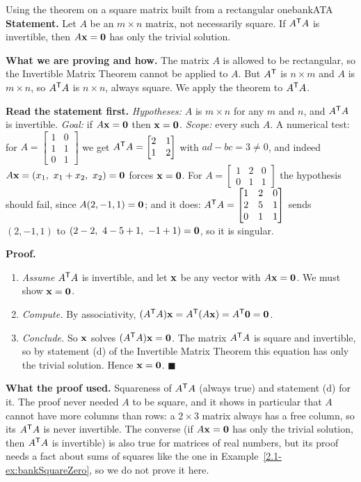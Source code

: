 \documentclass[11pt]{article}
\begin{document}
\begin{exmp}{Using the theorem on a square matrix built from a rectangular one}{bankATA}
\textbf{Statement.} Let $A$ be an $m\times n$ matrix, not necessarily square. If $A^{\mathsf T} A$ is invertible, then $A\mathbf{x}=\mathbf{0}$ has only the trivial solution.

\textbf{What we are proving and how.} The matrix $A$ is allowed to be rectangular, so the Invertible Matrix Theorem cannot be applied to $A$. But $A^{\mathsf T}$ is $n\times m$ and $A$ is $m\times n$, so $A^{\mathsf T} A$ is $n\times n$, always square. We apply the theorem to $A^{\mathsf T} A$.

\textbf{Read the statement first.} \emph{Hypotheses:} $A$ is $m\times n$ for any $m$ and $n$, and $A^{\mathsf T} A$ is invertible. \emph{Goal:} if $A\mathbf{x}=\mathbf{0}$ then $\mathbf{x}=\mathbf{0}$. \emph{Scope:} every such $A$. A numerical test: for $A=\begin{bmatrix}1&0\\1&1\\0&1\end{bmatrix}$ we get $A^{\mathsf T} A=\begin{bmatrix}2&1\\1&2\end{bmatrix}$ with $ad-bc=3\neq0$, and indeed $A\bv{x}=(x_1,\ x_1+x_2,\ x_2)=\bv{0}$ forces $\mathbf{x}=\mathbf{0}$. For $A=\begin{bmatrix}1&2&0\\0&1&1\end{bmatrix}$ the hypothesis should fail, since $A(2,-1,1)=\mathbf{0}$; and it does: $A^{\mathsf T} A=\begin{bmatrix}1&2&0\\2&5&1\\0&1&1\end{bmatrix}$ sends $(2,-1,1)$ to $(2-2,\ 4-5+1,\ -1+1)=\mathbf{0}$, so it is singular.

\textbf{Proof.}
\begin{enumerate}[itemsep=2pt]
  \item \emph{Assume} $A^{\mathsf T} A$ is invertible, and let $\mathbf{x}$ be any vector with $A\mathbf{x}=\mathbf{0}$. We must show $\mathbf{x}=\mathbf{0}$.
  \item \emph{Compute.} By associativity, $(A^{\mathsf T} A)\mathbf{x}=A^{\mathsf T}(A\mathbf{x})=A^{\mathsf T}\mathbf{0}=\mathbf{0}$.
  \item \emph{Conclude.} So $\mathbf{x}$ solves $(A^{\mathsf T} A)\mathbf{x}=\mathbf{0}$. The matrix $A^{\mathsf T} A$ is square and invertible, so by statement (d) of the Invertible Matrix Theorem this equation has only the trivial solution. Hence $\mathbf{x}=\mathbf{0}$. \qquad$\blacksquare$
\end{enumerate}

\textbf{What the proof used.} Squareness of $A^{\mathsf T} A$ (always true) and statement (d) for it. The proof never needed $A$ to be square, and it shows in particular that $A$ cannot have more columns than rows: a $2\times3$ matrix always has a free column, so its $A^{\mathsf T} A$ is never invertible. The converse (if $A\mathbf{x}=\mathbf{0}$ has only the trivial solution, then $A^{\mathsf T} A$ is invertible) is also true for matrices of real numbers, but its proof needs a fact about sums of squares like the one in Example~\ref{2.1-ex:bankSquareZero}, so we do not prove it here.
\end{exmp}
\end{document}
